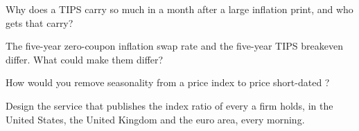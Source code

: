 \begin{interviewq}\label{iq:m2:inflation-markets:3}
Why does a TIPS carry so much in a month after a large inflation print, and
who gets that carry?
\end{interviewq}

\begin{interviewq}\label{iq:m2:inflation-markets:4}
The five-year zero-coupon inflation swap rate and the five-year TIPS breakeven
differ. What could make them differ?
\end{interviewq}

\begin{interviewq}\label{iq:m2:inflation-markets:5}
How would you remove seasonality from a price index to price short-dated
?
\end{interviewq}

\begin{interviewq}\label{iq:m2:inflation-markets:6}
Design the service that publishes the index ratio of every  a firm holds,
in the United States, the United Kingdom and the euro area, every morning.
\end{interviewq}
